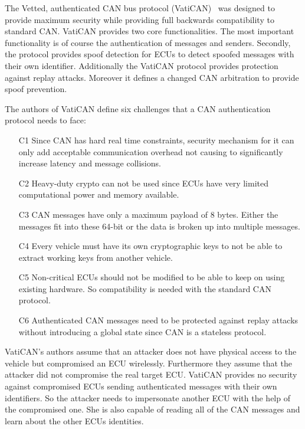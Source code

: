The Vetted, authenticated CAN bus protocol (VatiCAN)~\cite{Nurnberger2016} was
designed to provide maximum security while providing full backwards
compatibility to standard CAN\@. VatiCAN provides two core functionalities. The
most important functionality is of course the authentication of messages and
senders. Secondly, the protocol provides spoof detection for ECUs to detect
spoofed messages with their own identifier. Additionally the VatiCAN protocol
provides protection against replay attacks. Moreover it defines a changed CAN
arbitration to provide spoof prevention.

The authors of VatiCAN define six challenges that a CAN authentication protocol
needs to face:

\begin{enumerate}
    \item[C1] Since CAN has hard real time constraints, security mechanism for
    it can only add acceptable communication overhead not causing to
    significantly increase latency and message collisions. 
    \item[C2] Heavy-duty crypto can not be used since ECUs have very limited
    computational power and memory available.
    \item[C3] CAN messages have only a maximum payload of 8 bytes. Either the
    messages fit into these 64-bit or the data is broken up into multiple
    messages.
    \item[C4] Every vehicle must have its own cryptographic keys to not be able
    to extract working keys from another vehicle.
    \item[C5] Non-critical ECUs should not be modified to be able to keep on
    using existing hardware. So compatibility is needed with the standard CAN
    protocol.
    \item[C6] Authenticated CAN messages need to be protected against replay
    attacks without introducing a global state since CAN is a stateless
    protocol.
\end{enumerate}

VatiCAN's authors assume that an attacker does not have physical access to the
vehicle but compromised an ECU wirelessly. Furthermore they assume that the
attacker did not compromise the real target ECU\@. VatiCAN provides no security
against compromised ECUs sending authenticated messages with their own
identifiers. So the attacker needs to impersonate another ECU with the help of
the compromised one. She is also capable of reading all of the CAN messages and
learn about the other ECUs identities.

